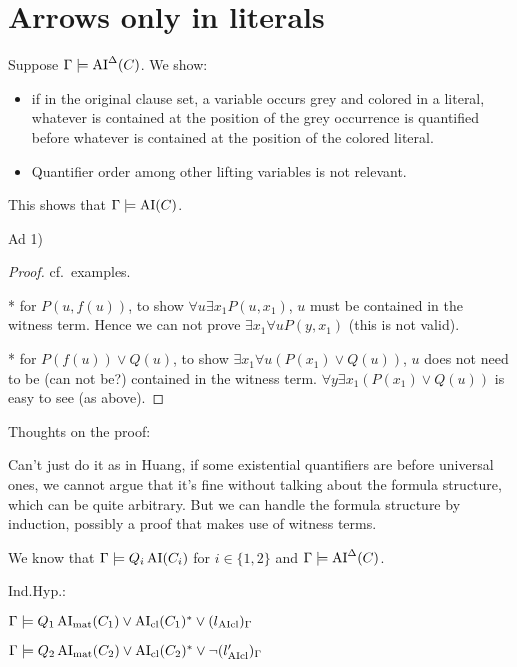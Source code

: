 \documentclass[,%
	paper=a4,%
	DIV10, %
	twoside=false,%
	liststotoc,
	bibtotoc,
	draft=false,%
	numbers=noendperiod
]{scrartcl}
\begin{document}
\section*{Arrows only in literals}

Suppose $\Gamma \models \operatorname{AI}^\Delta(C)$.
We show:
\begin{itemize}
		\item if in the original clause set, a variable occurs grey and colored in a literal, whatever is contained at the position of the grey occurrence is quantified before whatever is contained at the position of the colored literal.
	
	\item[\circled{2}] Quantifier order among other lifting variables is not relevant.
\end{itemize}
This shows that $\Gamma \models \operatorname{AI}(C)$. 

Ad 1)

\begin{cprop}
\end{cprop}
\begin{proof}
	cf.~examples.

	* for $P(u, f(u))$, to show $\forall u \exists x_1 P(u, x_1)$, $u$ must be contained in the witness term.
	Hence we can not prove $\exists x_1 \forall u P(y, x_1)$ (this is not valid).

	* for $P(f(u)) \lor Q(u)$, to show $\exists x_1 \forall u (P(x_1) \lor Q(u))$, $u$ does not need to be (can not be?) contained in the witness term.
	$\forall y \exists x_1 (P(x_1) \lor Q(u))$ is easy to see (as above).
\end{proof}

Thoughts on the proof:

Can't just do it as in Huang, if some existential quantifiers are before universal ones, we cannot argue that it's fine without talking about the formula structure, which can be quite arbitrary. 
But we can handle the formula structure by induction, possibly a proof that makes use of witness terms. 

We know that $\Gamma \models Q_i \operatorname{AI}(C_i)$ for $i\in\{1,2\}$ and $\Gamma \models \operatorname{AI}^\Delta(C)$.

\newcommand{\clauseOnePrime}{\AIclause(C_1)^*}
\newcommand{\clauseTwoPrime}{\AIclause(C_2)^*}

Ind.Hyp.:

$\Gamma \entails Q_1 \AImatrix(C_1) \lor \clauseOnePrime \lor {(l{\fromclause})_\Gamma}$

$\Gamma \entails Q_2 \AImatrix(C_2) \lor \clauseTwoPrime \lor {\lnot (l{\fromclause'})_\Gamma}$
\end{document}

